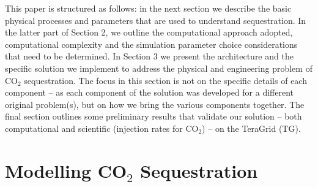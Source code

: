 \documentclass{acm_proc_article-sp}
\newcommand{\jhanote}[1]{ {\textcolor{red} { ***Jha: #1 }}}
\newcommand{\yyenote}[1]{ {\textcolor{blue} { ***yye00: #1 }}}
\newcommand{\jhanote}[1]{}
\newcommand{\yyenote}[1]{}
\begin{document}
This paper is structured as follows: in the next section we describe the basic
physical processes and parameters that are used to understand
sequestration. In the latter part of Section 2, we outline the
computational approach adopted, computational complexity and the
simulation parameter choice considerations that need to be determined.
In Section 3 we present the architecture and the specific solution we
implement to address the physical and engineering problem of CO$_2$
sequestration. The focus in this section is not on the specific
details of each component -- as each component of the solution was
developed for a different original problem(s), but on how we bring the
various components together.  The final section outlines some
preliminary results that validate our solution -- both computational
and scientific (injection rates for CO$_2$) -- on the TeraGrid (TG).



\section{Modelling CO$_2$ Sequestration}

\vspace{0.1in}


\end{document}
